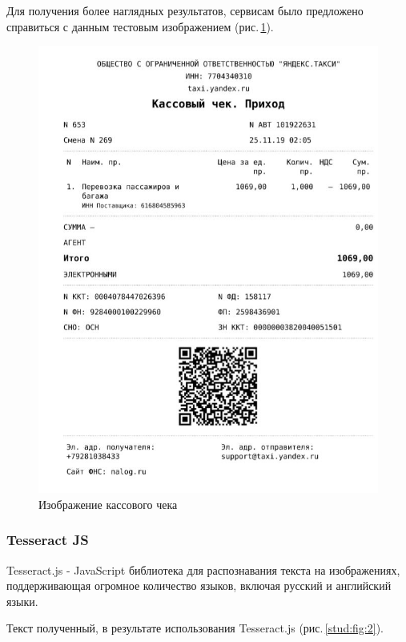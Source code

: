 \documentclass[14pt]{mmcs_article}
\begin{document}
Для получения более наглядных результатов, сервисам было предложено справиться с данным тестовым изображением (рис.\,\ref{stud:fig:1}).
\begin{figure}[H]
  \centering
  \includegraphics[scale=0.5]{Снимок.JPG}
  \caption{Изображение кассового чека}\label{stud:fig:1}
\end{figure}
\subsubsection{Tesseract JS}

Tesseract.js - JavaScript библиотека для распознавания текста на изображениях, поддерживающая огромное количество языков, включая русский и английский языки.

Текст полученный, в результате использования Tesseract.js (рис.\,\ref{stud:fig:2}).
\end{document}
